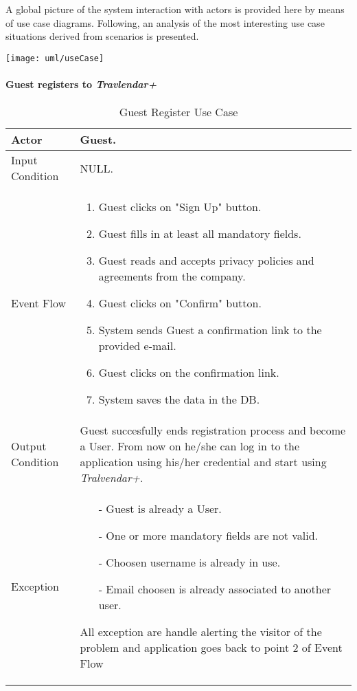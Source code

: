 A global picture of the system interaction with actors is provided here by means of use case diagrams. Following, an analysis of the most interesting use case situations derived from scenarios is presented.

	\texttt{[image: uml/useCase]}


	\paragraph{Guest registers to \textit{Travlendar+}}\label{register_useCase}
		\begin{table}[H]
			\begin{tabular}{| l | p{} | }
				\hline
				\hline
				Actor	&		Guest. \\
				\hline
				Input Condition		&		NULL. \\
				\hline
				Event Flow		&		\begin{enumerate}
													\item Guest clicks on "Sign Up" button.
													\item Guest fills in at least all mandatory fields.
													\item Guest reads and accepts privacy policies and agreements from the company.
													\item Guest clicks on "Confirm" button.
													\item System sends Guest a confirmation link to the provided e-mail.
													\item Guest clicks on the confirmation link.
													\item	 System saves the data in the DB.
												\end{enumerate} \\
				\hline
				Output Condition		&		Guest succesfully ends registration process and become a User. From now on he/she can log in to the application using his/her credential and start using \textit{Tralvendar+}. \\
				\hline		
				Exception		&		\begin{itemize}
												\item[-] Guest is already a User.
												\item[-] One or more mandatory fields are not valid.
												\item[-] Choosen username is already in use.
												\item[-] Email choosen is already associated to another user.
											\end{itemize}
											All exception are handle alerting the visitor of the problem and application goes back to point 2 of Event Flow \\
				\hline
				\hline
			\end{tabular}
			\caption{Guest Register Use Case}
		\end{table}

